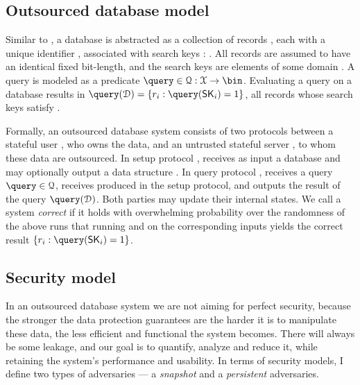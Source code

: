 		\subsection{Outsourced database model}\label{section:introduction:model:odb}

			Similar to \cite{epsolute}, a database is abstracted as a collection of \dataSize{} records \record{}, each with a unique identifier \recordID{}, associated with search keys \searchKey{}: \databaseDef{}.
			All records are assumed to have an identical fixed bit-length, and the search keys are elements of some domain \searchKeyDomain{}.
			A query is modeled as a predicate $\query \in \querySet: \searchKeyDomain \to \bin$.
			Evaluating a query \query{} on a database \database{} results in $\query( \database ) = \{ \record_i : \query( \searchKey_i ) = 1 \}$, all records whose search keys satisfy \query{}.

			Formally, an outsourced database system consists of two protocols between a stateful user \user{}, who owns the data, and an untrusted stateful server \server{}, to whom these data are outsourced.
			In setup protocol \protocolSetup{}, \user{} receives as input a database \databaseDef{} and \server{} may optionally output a data structure \serverDS{}.
			In query protocol \protocolQuery{}, \user{} receives a query $\query \in \querySet$, \server{} receives \serverDS{} produced in the setup protocol, and \user{} outputs the result of the query $\query( \database )$.
			Both parties may update their internal states.
			We call a system \emph{correct} if it holds with overwhelming probability over the randomness of the above runs that running \protocolSetup{} and  \protocolQuery{} on the corresponding inputs yields the correct result $\{ \record_i : \query( \searchKey_i ) = 1 \}$.

		\subsection{Security model}

			In an outsourced database system we are not aiming for perfect security, because the stronger the data protection guarantees are the harder it is to manipulate these data, the less efficient and functional the system becomes.
			There will always be some leakage, and our goal is to quantify, analyze and reduce it, while retaining the system's performance and usability.
			In terms of security models, I define two types of adversaries --- a \emph{snapshot} and a \emph{persistent} adversaries.

